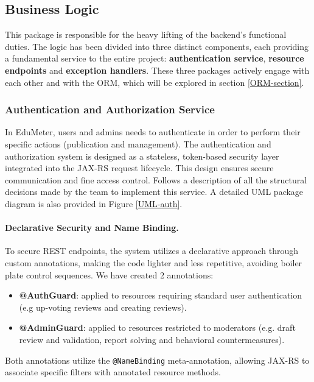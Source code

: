\subsection{Business Logic}

This package is responsible for the heavy lifting of the backend's functional duties. The logic has been divided into three distinct components, each providing a fundamental service to the entire project: \textbf{authentication service}, \textbf{resource endpoints} and \textbf{exception handlers}. These three packages actively engage with each other and with the ORM, which will be explored in section \ref{ORM-section}.

\subsubsection{Authentication and Authorization Service}
In EduMeter, users and admins needs to authenticate in order to perform their specific actions (publication and management). The authentication and authorization system is designed as a stateless, token-based security layer integrated into the JAX-RS request lifecycle. This design ensures secure communication and fine access control. Follows a description of all the structural decisions made by the team to implement this service. A detailed UML package diagram is also provided in Figure \ref{UML-auth}.

\paragraph{Declarative Security and Name Binding.} To secure REST endpoints, the system utilizes a declarative approach through custom annotations, making the code lighter and less repetitive, avoiding boiler plate control sequences. We have created 2 annotations:
\begin{itemize}
	\item \textbf{@AuthGuard}: applied to resources requiring standard user authentication (e.g up-voting reviews and creating reviews).
	\item \textbf{@AdminGuard}: applied to resources restricted to moderators (e.g. draft review and validation, report solving and behavioral countermeasures).
\end{itemize}

\noindent Both annotations utilize the \texttt{@NameBinding} meta-annotation, allowing JAX-RS to associate specific filters with annotated resource methods.


